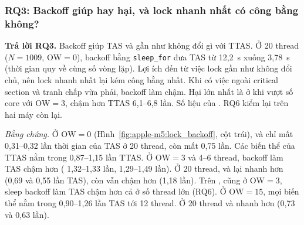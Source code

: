 \subsubsection{RQ3: Backoff giúp hay hại, và lock nhanh nhất có công bằng không?}

\begin{rqanswer}\textbf{Trả lời RQ3.} Backoff giúp TAS và gần như không đổi gì với TTAS. Ở 20 thread
($N = 1009$, $\mathrm{OW} = 0$), backoff bằng \texttt{sleep\_for} đưa TAS từ 12,2~s xuống 3,78~s
(thời gian quy về cùng số vòng lặp). Lợi ích đến từ việc lock gần như không đổi chủ, nên lock nhanh
nhất lại kém công bằng nhất. Khi có việc ngoài critical section và tranh chấp vừa phải, backoff làm
chậm. Hại lớn nhất là ở  khi vượt số core với $\mathrm{OW} = 3$, chậm hơn TTAS
6,1--6,8 lần. Số liệu của . RQ6 kiểm lại trên hai máy còn lại.\end{rqanswer}


\emph{Bằng chứng.} Ở $\mathrm{OW} = 0$ (Hình~\ref{fig:apple-m5:lock_backoff}, cột trái),
 và  chỉ mất 0,31--0,32 lần thời gian của TAS ở 20 thread,
còn  mất 0,75 lần. Các biến thể của TTAS nằm trong 0,87--1,15 lần TTAS. Ở
$\mathrm{OW} = 3$ và 4--6 thread, backoff làm TAS chậm hơn ( 1,32--1,33 lần,
 1,29--1,49 lần). Ở 20 thread,  và  lại
nhanh hơn (0,69 và 0,55 lần TAS), còn  vẫn chậm hơn (1,18 lần). Trên
, cũng ở $\mathrm{OW} = 3$, sleep backoff làm TAS chậm hơn cả ở số thread lớn (RQ6). Ở
$\mathrm{OW} = 15$, mọi biến thể nằm trong 0,90--1,26 lần TAS tới 12 thread. Ở 20 thread
 và  nhanh hơn (0,73 và 0,63 lần).


